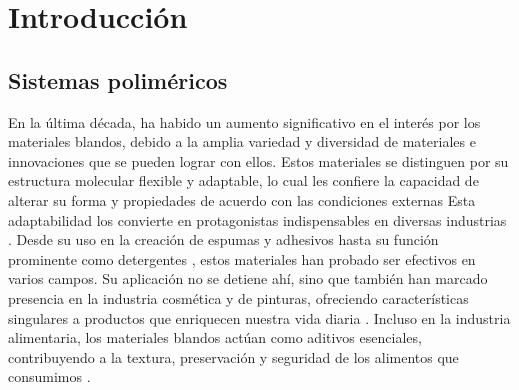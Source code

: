 
\chapter{Introducci\'on}
\label{Chapter1} %


\section{Sistemas polim\'ericos}

En la \'ultima d\'ecada, ha habido un aumento significativo en el inter\'es por los materiales blandos, debido a la amplia variedad y diversidad de materiales e innovaciones que se pueden lograr con ellos. Estos materiales se distinguen por su estructura molecular flexible y adaptable, lo cual les confiere la capacidad de alterar su forma y propiedades de acuerdo con las condiciones externas
Esta adaptabilidad los convierte en protagonistas indispensables en diversas industrias \cite{zhu2022review}. 
Desde su uso en la creaci\'on de espumas y adhesivos  \cite{wu2021review}  hasta su funci\'on prominente como detergentes \cite{chowdhury2019novel}, estos materiales han probado ser efectivos en varios campos. Su aplicaci\'on no se detiene ah\'i, sino que tambi\'en han marcado presencia en la industria cosm\'etica y de pinturas, ofreciendo caracter\'isticas singulares a productos que enriquecen nuestra vida diaria \cite{hirst2019fundamentals}. Incluso en la industria alimentaria, los materiales blandos act\'uan como aditivos esenciales, contribuyendo a la textura, preservaci\'on y seguridad de los alimentos que consumimos \cite{kwok2019microgel}.


